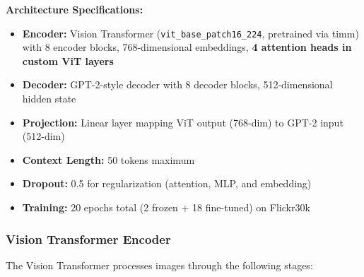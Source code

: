 \documentclass[12pt]{article}
\begin{document}
\begin{architecturebox}
\textbf{Architecture Specifications:}
\begin{itemize}
\item \textbf{Encoder:} Vision Transformer (\texttt{vit\_base\_patch16\_224}, pretrained via timm) with 8 encoder blocks, 768-dimensional embeddings, \textbf{4 attention heads in custom ViT layers}
\item \textbf{Decoder:} GPT-2-style decoder with 8 decoder blocks, 512-dimensional hidden state
\item \textbf{Projection:} Linear layer mapping ViT output (768-dim) to GPT-2 input (512-dim)
\item \textbf{Context Length:} 50 tokens maximum
\item \textbf{Dropout:} 0.5 for regularization (attention, MLP, and embedding)
\item \textbf{Training:} 20 epochs total (2 frozen + 18 fine-tuned) on Flickr30k
\end{itemize}
\end{architecturebox}

\subsubsection{Vision Transformer Encoder}
The Vision Transformer processes images through the following stages:
\end{document}
